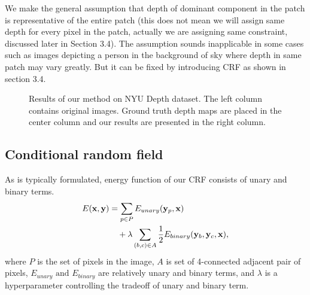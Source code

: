 \documentclass[10pt,twocolumn,letterpaper]{article}
\begin{document}
We make the general assumption that depth of dominant component in the patch is representative of the entire patch (this does not mean we will assign same depth for every pixel in the patch, actually we are assigning same constraint, discussed later in Section 3.4). The assumption sounds inapplicable in some cases such as images depicting a person in the background of sky where depth in same patch may vary greatly. But it can be fixed by introducing CRF as shown in section 3.4.

\begin{figure}[!ht]
\begin{center}
\end{center}
   \caption{Results of our method on NYU Depth dataset. The left column contains original images. Ground truth depth maps are placed in the center column and our results are presented in the right column.}
\label{fig:short}
\end{figure} 

\subsection{Conditional random field}
As is typically formulated, energy function of our CRF consists of unary and binary terms.
\begin{align}
E(\mathbf{x}, \mathbf{y}) &= \sum_{p \in P}E_{unary}(\mathbf{y}_{p}, \mathbf{x}) \notag \\ &\quad + \lambda \sum_{(b, c) \in A} \frac{1}{2} E_{binary}(\mathbf{y}_b, \mathbf{y}_c, \mathbf{x}),
\end{align}
where $P$ is the set of pixels in the image, $A$ is set of 4-connected adjacent pair of pixels, $E_{unary}\text{ and }E_{binary}$ are relatively unary and binary terms, and $\lambda$ is a hyperparameter controlling the tradeoff of unary and binary term.
\end{document}

